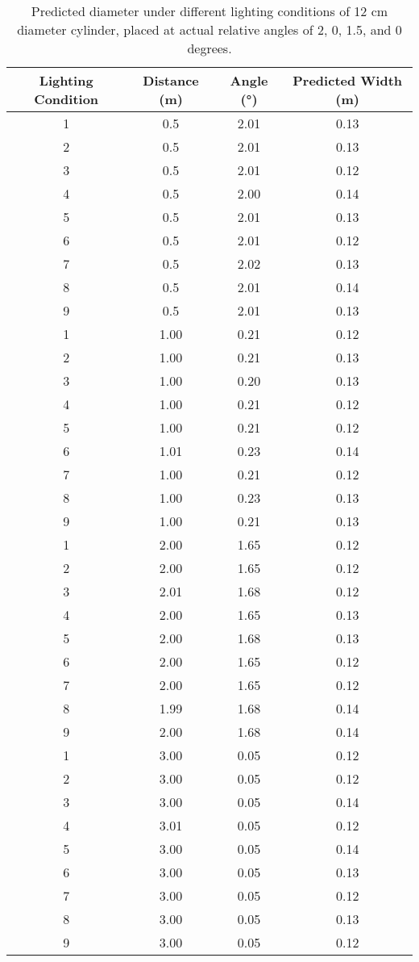 \begin{table}[htbp]
\centering
\caption{Predicted diameter under different lighting conditions of 12 cm diameter cylinder, placed at actual relative angles of 2, 0, 1.5, and 0 degrees.}
\label{tab:12cm}
\begin{tabular}{cccc}
\toprule
\textbf{Lighting Condition} & \textbf{Distance (m)} & \textbf{Angle (°)} & \textbf{Predicted Width (m)} \\
\midrule
1 & 0.5 & 2.01 & 0.13 \\
2 & 0.5 & 2.01 & 0.13 \\
3 & 0.5 & 2.01 & 0.12 \\
4 & 0.5 & 2.00 & 0.14 \\
5 & 0.5 & 2.01 & 0.13 \\
6 & 0.5 & 2.01 & 0.12 \\
7 & 0.5 & 2.02 & 0.13 \\
8 & 0.5 & 2.01 & 0.14 \\
9 & 0.5 & 2.01 & 0.13 \\
\cmidrule(lr){1-4}
1 & 1.00 & 0.21 & 0.12 \\
2 & 1.00 & 0.21 & 0.13 \\
3 & 1.00 & 0.20 & 0.13 \\
4 & 1.00 & 0.21 & 0.12 \\
5 & 1.00 & 0.21 & 0.12 \\
6 & 1.01 & 0.23 & 0.14 \\
7 & 1.00 & 0.21 & 0.12 \\
8 & 1.00 & 0.23 & 0.13 \\
9 & 1.00 & 0.21 & 0.13 \\
\cmidrule(lr){1-4}
1 & 2.00 & 1.65 & 0.12 \\
2 & 2.00 & 1.65 & 0.12 \\
3 & 2.01 & 1.68 & 0.12 \\
4 & 2.00 & 1.65 & 0.13 \\
5 & 2.00 & 1.68 & 0.13 \\
6 & 2.00 & 1.65 & 0.12 \\
7 & 2.00 & 1.65 & 0.12 \\
8 & 1.99 & 1.68 & 0.14 \\
9 & 2.00 & 1.68 & 0.14 \\
\cmidrule(lr){1-4}
1 & 3.00 & 0.05 & 0.12 \\
2 & 3.00 & 0.05 & 0.12 \\
3 & 3.00 & 0.05 & 0.14 \\
4 & 3.01 & 0.05 & 0.12 \\
5 & 3.00 & 0.05 & 0.14 \\
6 & 3.00 & 0.05 & 0.13 \\
7 & 3.00 & 0.05 & 0.12 \\
8 & 3.00 & 0.05 & 0.13 \\
9 & 3.00 & 0.05 & 0.12 \\
\bottomrule
\end{tabular}
\end{table}
